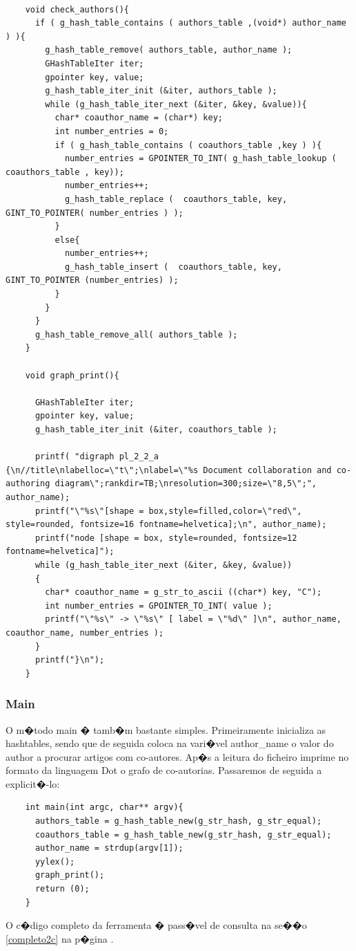 \documentclass{report}
\begin{document}
      \begin{lstlisting}

    void check_authors(){
      if ( g_hash_table_contains ( authors_table ,(void*) author_name ) ){
        g_hash_table_remove( authors_table, author_name );
        GHashTableIter iter;
        gpointer key, value;
        g_hash_table_iter_init (&iter, authors_table );
        while (g_hash_table_iter_next (&iter, &key, &value)){
          char* coauthor_name = (char*) key;
          int number_entries = 0;
          if ( g_hash_table_contains ( coauthors_table ,key ) ){
            number_entries = GPOINTER_TO_INT( g_hash_table_lookup ( coauthors_table , key));
            number_entries++;
            g_hash_table_replace (  coauthors_table, key, GINT_TO_POINTER( number_entries ) );
          }
          else{
            number_entries++;
            g_hash_table_insert (  coauthors_table, key,   GINT_TO_POINTER (number_entries) );
          }
        }
      }
      g_hash_table_remove_all( authors_table );
    }

    void graph_print(){

      GHashTableIter iter;
      gpointer key, value;
      g_hash_table_iter_init (&iter, coauthors_table );

      printf( "digraph pl_2_2_a {\n//title\nlabelloc=\"t\";\nlabel=\"%s Document collaboration and co-authoring diagram\";rankdir=TB;\nresolution=300;size=\"8,5\";", author_name);
      printf("\"%s\"[shape = box,style=filled,color=\"red\", style=rounded, fontsize=16 fontname=helvetica];\n", author_name);
      printf("node [shape = box, style=rounded, fontsize=12 fontname=helvetica]");
      while (g_hash_table_iter_next (&iter, &key, &value))
      {
        char* coauthor_name = g_str_to_ascii ((char*) key, "C");
        int number_entries = GPOINTER_TO_INT( value );
        printf("\"%s\" -> \"%s\" [ label = \"%d\" ]\n", author_name, coauthor_name, number_entries );
      }
      printf("}\n");
    } 
    \end{lstlisting}

    \subsubsection{Main}
    O m�todo main � tamb�m bastante simples. Primeiramente  inicializa as hashtables, sendo que de seguida coloca na vari�vel author\_name o valor do author a procurar artigos com co-autores. Ap�s a leitura do ficheiro imprime  no formato da linguagem Dot o grafo de co-autorias. Passaremos de seguida a explicit�-lo:
      \begin{lstlisting}
    int main(int argc, char** argv){
      authors_table = g_hash_table_new(g_str_hash, g_str_equal);
      coauthors_table = g_hash_table_new(g_str_hash, g_str_equal);
      author_name = strdup(argv[1]);
      yylex();
      graph_print();
      return (0);
    }
    \end{lstlisting}
    O c�digo completo da ferramenta � pass�vel de consulta na se��o \ref{completo2c} na p�gina \pageref{completo2c}.
\end{document}
